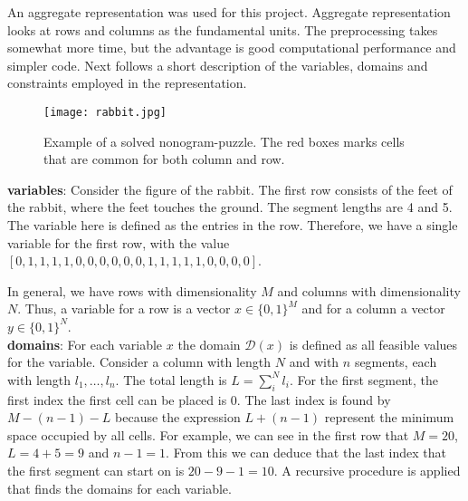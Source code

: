 \newenvironment{myitemize} %
{ \begin{itemize}
    \setlength{\itemsep}{0pt}
    \setlength{\parskip}{0pt}
    \setlength{\parsep}{0pt}     }
{ \end{itemize}                  } 

An aggregate representation was used for this project. Aggregate representation
looks at rows and columns as the fundamental units. The preprocessing takes
somewhat more time, but the advantage is good computational performance and
simpler code. Next follows a short description of the variables, domains and
constraints employed in the representation.\\

\begin{figure}[b]
    \centering
    \texttt{[image: rabbit.jpg]}
    \caption{Example of a solved nonogram-puzzle. The red boxes marks cells
    that are common for both column and row.} 
    
\end{figure}

\noindent
\textbf{variables}: Consider the figure of the rabbit. The first row consists of the feet of the rabbit, where the feet touches the ground.
The segment lengths are 4 and 5. The variable here is defined as the entries in the row.
Therefore, we have a single variable for the first row, with the value $[0, 1, 1, 1, 1, 0, 0, 0, 0, 0, 0, 1, 1, 1, 1, 1, 0, 0, 0, 0]$.

In general, we have rows with dimensionality $M$ and columns with dimensionality $N$. Thus, a variable for a row is a vector
$x \in \{0, 1\}^M$ and for a column a vector $y \in \{0, 1\}^N$.\\

\noindent
\textbf{domains}: For each variable $x$ the domain $\mathcal{D}(x)$ is
defined as all feasible values for the variable.  Consider a column with length
$N$ and with $n$ segments, each with length $l_1,\ldots, l_n$. The total
length is $L = \sum_i^N l_i$. For the first segment, the first index the first
cell can be placed is 0.  The last index is found by $M - (n-1) - L$ because the
expression $L + (n-1)$ represent the minimum space occupied by all cells.
For example, we can see in the first row that $M = 20$, $L = 4 + 5 = 9$ and $n-1 = 1$.
From this we can deduce that the last index that the first segment can start on
is $20 - 9 - 1 = 10$. A recursive procedure is applied that finds the domains
for each variable.\\

